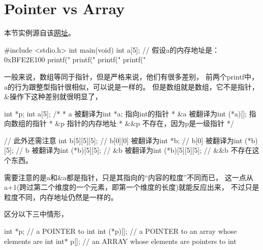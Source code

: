 \section[Pointer vs Array]{Pointer vs Array}
本节实例源自该\href{http://coolshell.cn/articles/5761.html}{网址}。

\begin{cppcode}
#include <stdio.h>
int main(void)
{
  int a[5];             // 假设a的内存地址是：0xBFE2E100
  printf("%
  printf("%
  printf("%
  printf("%
}
\end{cppcode}

一般来说，数组等同于指针，但是严格来说，他们有很多差别，
前两个printf中，a的行为跟整型指针很相似，可以说是一样的。
但是数组就是数组，它不是指针，\&操作下这种差别就很明显了，

\begin{cppcode}
int *p;
int a[5];
/*
 * a    被翻译为int *a; 指向int的指针
 * &a   被翻译为int (*a)[]; 指向数组的指针
 * &p   指针的内存地址
 * &&p  不存在，因为p是一级指针
 */
 
// 此外还需注意
int b[5][5][5];
// b[0][0]  被翻译为int *b;
// b[0]     被翻译为int (*b)[5];
// b        被翻译为int (*b)[5][5];
// &b       被翻译为int (*b)[5][5][5];
// &&b      不存在这个东西。
\end{cppcode}

需要注意的是a和\&a都是指针，只是其指向的“内容的粒度”不同而已，
这一点从a+1(跨过第二个维度的一个元素，即第一个维度的长度)就能反应出来，
不过只是粒度不同，内存地址仍然是一样的。

区分以下三中情形，

\begin{cppcode}
int *p;
// a POINTER to int
int (*p)[];
// a POINTER to an array whose elements are int
int* p[];
// an ARRAY whose elements are pointers to int
\end{cppcode}
